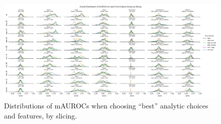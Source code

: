 \documentclass{article}  %
\begin{document}
\begin{figure}[H]
\begin{center}
\includegraphics[width=\textwidth,height=0.9\textheight,keepaspectratio]{best_rmt_params_by_subgroup_and_slicing.png}
\end{center}
\caption
{ \label{fig:best-params-slicing}
Distributions of mAUROCs when choosing ``best'' analytic choices and features, by slicing.}
\end{figure}
\end{document}

